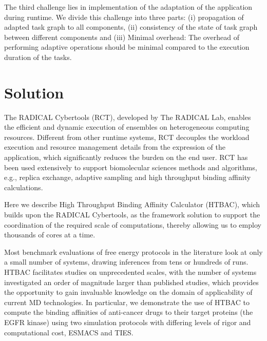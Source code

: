 \documentclass[conference]{IEEEtran}
\begin{document}
The third challenge lies in implementation of the adaptation of the
application during runtime. We divide this challenge into three parts: (i)
propagation of adapted task graph to all components, (ii) consistency of the
state of task graph between different components and (iii) Minimal overhead:
The overhead of performing adaptive operations should be minimal compared to
the execution duration of the tasks.


\section{Solution}\label{sec:solution}


The RADICAL Cybertools (RCT), developed by The RADICAL Lab, enables the
efficient and dynamic execution of ensembles on heterogeneous computing
resources. Different from other runtime systems, RCT decouples the workload
execution and resource management details from the expression of the
application, which significantly reduces the burden on the end user.
RCT has been used extensively to support
biomolecular sciences methods and algorithms, e.g., replica exchange, adaptive
sampling and high throughput binding affinity calculations.

Here we describe High Throughput Binding Affinity Calculator (HTBAC),
which builds upon the RADICAL Cybertools, as the framework solution to support
the coordination of the required scale of computations, thereby
allowing us to employ thousands of cores at a time.

Most benchmark evaluations of free energy protocols in the literature look
at only a small number of systems, drawing inferences from tens or hundreds
of runs. HTBAC facilitates studies on unprecedented scales, with the number
of systems investigated an order of magnitude larger than published studies,
which provides the opportunity to gain invaluable knowledge on the domain of
applicability of current MD technologies. In particular, we demonstrate the
use of HTBAC to compute the binding affinities of anti-cancer drugs to their
target proteins (the EGFR kinase) using two simulation protocols with differing
levels of rigor and computational cost, ESMACS and TIES.
\end{document}
